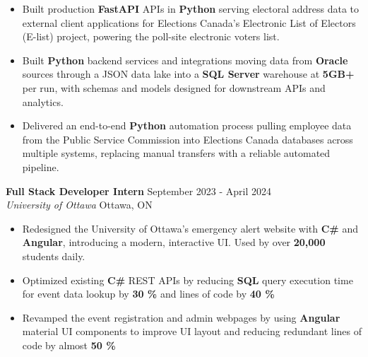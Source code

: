 \documentclass[a4paper]{article}
\begin{document}
\begin{itemize}
\item Built production \textbf{FastAPI} APIs in \textbf{Python} serving electoral address data to external client applications for Elections Canada's Electronic List of Electors (E-list) project, powering the poll-site electronic voters list.

\item Built \textbf{Python} backend services and integrations moving data from \textbf{Oracle} sources through a JSON data lake into a \textbf{SQL Server} warehouse at \textbf{5GB+} per run, with schemas and models designed for downstream APIs and analytics.

\item Delivered an end-to-end \textbf{Python} automation process pulling employee data from the Public Service Commission into Elections Canada databases across multiple systems, replacing manual transfers with a reliable automated pipeline.

\end{itemize}

\textbf{Full Stack Developer Intern } \hfill September 2023 - April 2024\\
\textit{University of Ottawa} \hfill Ottawa, ON\\
\vspace{-2mm}
\begin{itemize} \itemsep -4pt
    \item Redesigned the University of Ottawa's emergency alert website with \textbf{C\#} and \textbf{Angular}, introducing a modern, interactive UI. Used by over \textbf{20,000} students daily.
     \item Optimized existing \textbf{C\#} REST APIs by reducing \textbf{SQL} query execution time for event data lookup by \textbf{30 \%} and lines of code by \textbf{40 \%}
    \item Revamped the event registration and admin webpages by using \textbf{Angular} material UI components to improve UI layout and reducing redundant lines of code by almost \textbf{50 \%}
\end{itemize}
\end{document}
